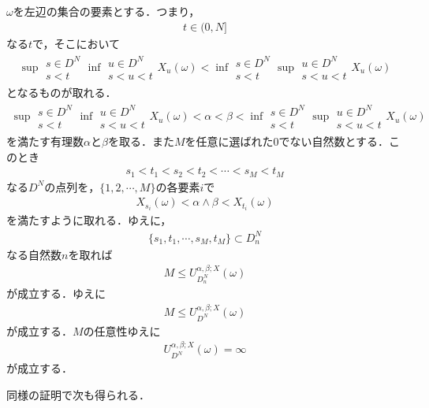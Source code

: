  	\begin{sketch}
 		$\omega$を左辺の集合の要素とする．つまり，
 		\begin{align}
 			t \in (0,N]
 		\end{align}
 		なる$t$で，そこにおいて
 		\begin{align}
 			\sup{\substack{s \in D^N \\ s < t}}{\inf{\substack{u \in D^N \\ s < u < t}}{X_u(\omega)}} 
 			< \inf{\substack{s \in D^N \\ s < t}}{\sup{\substack{u \in D^N \\ s < u < t}}{X_u(\omega)}}
 		\end{align}
 		となるものが取れる．
 		\begin{align}
 			\sup{\substack{s \in D^N \\ s < t}}{\inf{\substack{u \in D^N \\ s < u < t}}{X_u(\omega)}} 
 			< \alpha < \beta < \inf{\substack{s \in D^N \\ s < t}}{\sup{\substack{u \in D^N \\ s < u < t}}{X_u(\omega)}}
 		\end{align}
 		を満たす有理数$\alpha$と$\beta$を取る．また$M$を任意に選ばれた$0$でない自然数とする．このとき
 		\begin{align}
 			s_1 < t_1 < s_2 < t_2 < \cdots < s_M < t_M
 		\end{align}
 		なる$D^N$の点列を，$\{1,2,\cdots,M\}$の各要素$i$で
 		\begin{align}
 			X_{s_i}(\omega) < \alpha \wedge \beta < X_{t_i}(\omega)
 		\end{align}
 		を満たすように取れる．ゆえに，
 		\begin{align}
 			\{s_1,t_1,\cdots,s_M,t_M\} \subset D^N_n
 		\end{align}
 		なる自然数$n$を取れば
 		\begin{align}
 			M \leq U_{D_n^N}^{\alpha,\beta;X}(\omega)
 		\end{align}
 		が成立する．ゆえに
 		\begin{align}
 			M \leq U_{D^N}^{\alpha,\beta;X}(\omega)
 		\end{align}
 		が成立する．$M$の任意性ゆえに
 		\begin{align}
 			U_{D^N}^{\alpha,\beta;X}(\omega) = \infty
 		\end{align}
 		が成立する．
 		\QED
 	\end{sketch}
 	
 	同様の証明で次も得られる．
 	
